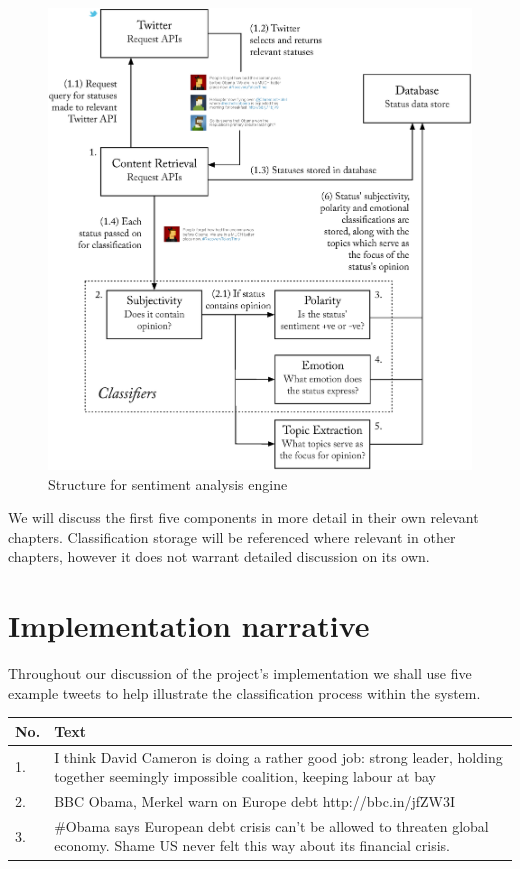 \begin{figure}[h!]
	\caption{Structure for sentiment analysis engine}
	\label{fig:outline_diagram}
	\centering
		\includegraphics[width=1\textwidth]{figures/outline.eps}
\end{figure}

We will discuss the first five components in more detail in their own relevant chapters. Classification storage will be referenced where relevant in other chapters, however it does not warrant detailed discussion on its own. 

\section{Implementation narrative}

Throughout our discussion of the project's implementation we shall use five example tweets to help illustrate the classification process within the system. 

\begin{tabular}{ | l | p{4in} | }
	\hline
	No. & Text \\
	\hline
	1. & I think David Cameron is doing a rather good job: strong leader, holding together seemingly impossible coalition, keeping labour at bay \\ %
	2. & BBC Obama, Merkel warn on Europe debt http://bbc.in/jfZW3I \\ %
	3. & \#Obama says European debt crisis can't be allowed to threaten global economy. Shame US never felt this way about its financial crisis. \\ %
	\hline
\end{tabular}





